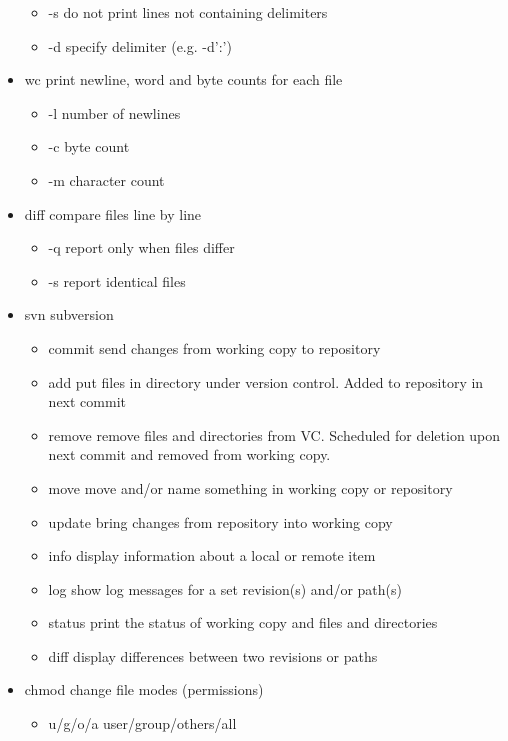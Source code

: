 \documentclass[10pt, a4paper]{article}
\begin{document}
\begin{multicols}{4}
\begin{itemize}
\begin{itemize}
        \item  -s  do not print lines not containing delimiters 
        \item  -d  specify delimiter (e.g. -d':')
        \end{itemize}
        \item wc  print newline, word and byte counts for each file
        \begin{itemize}
        \item  -l  number of newlines 
        \item  -c  byte count 
        \item  -m  character count 
        \end{itemize}
        \item diff  compare files line by line
        \begin{itemize}
        \item  -q  report only when files differ 
        \item  -s  report identical files 
        \end{itemize}
        \item svn  subversion
        \begin{itemize}
        \item commit  send changes from working copy to repository
        \item add put files in directory under version control. Added to repository in next commit
        \item remove remove files and directories from VC. Scheduled for deletion upon next commit and removed from working copy.
        \item move move and/or name something in working copy or repository
        \item update bring changes from repository into working copy
        \item info display information about a local or remote item
        \item log show log messages for a set revision(s) and/or path(s)
        \item status print the status of working copy and files and directories
        \item diff display differences between two revisions or paths
        \end{itemize}
        \item chmod  change file modes (permissions)
        \begin{itemize}
            \item u/g/o/a user/group/others/all

\end{itemize}
\end{itemize}
\end{multicols}
\end{document}
